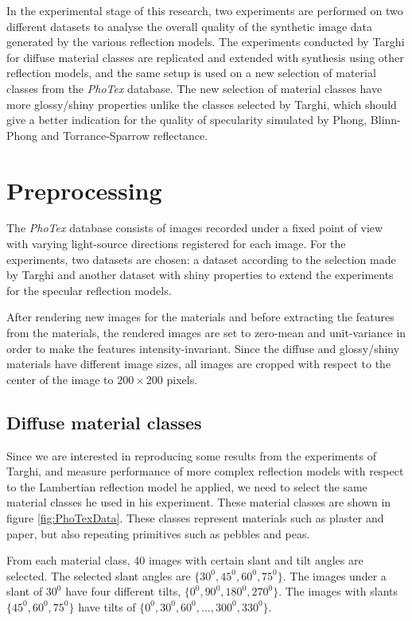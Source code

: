 \hypertarget{experiments}{
}

In the experimental stage of this research, two experiments are performed on two different datasets to analyse the overall quality of the synthetic image data generated by the various reflection models. The experiments conducted by Targhi for diffuse material classes are replicated and extended with synthesis using other reflection models, and the same setup is used on a new selection of material classes from the {\it PhoTex} database. The new selection of material classes have more glossy/shiny properties unlike the classes selected by Targhi, which should give a better indication for the quality of specularity simulated by Phong, Blinn-Phong and Torrance-Sparrow reflectance. 

\section{Preprocessing}\label{sec:preprocessing}
The {\it PhoTex} database consists of images recorded under a fixed point of view with varying light-source directions registered for each image. For the experiments, two datasets are chosen: a dataset according to the selection made by Targhi and another dataset with shiny properties to extend the experiments for the specular reflection models. 

After rendering new images for the materials and before extracting the features from the materials, the rendered images are set to zero-mean and unit-variance in order to make the features intensity-invariant. Since the diffuse and glossy/shiny materials have different image sizes, all images are cropped with respect to the center of the image to $200 \times 200$ pixels.

\subsection{Diffuse material classes}
Since we are interested in reproducing some results from the experiments of Targhi, and measure performance of more complex reflection models with respect to the Lambertian reflection model he applied, we need to select the same material classes he used in his experiment. These material classes are shown in figure \ref{fig:PhoTexData}. These classes represent materials such as plaster and paper, but also repeating primitives such as pebbles and peas.

From each material class, 40 images with certain slant and tilt angles are selected. The selected slant angles are $\{30^0, 45^0,60^0,75^0\}$. The images under a slant of $30^0$ have four different tilts, $\{0^0, 90^0, 180^0, 270^0\}$. The images with slants $\{45^0,60^0,75^0\}$ have tilts of $\{0^0,30^0,60^0,..., 300^0,330^0\}$. 

